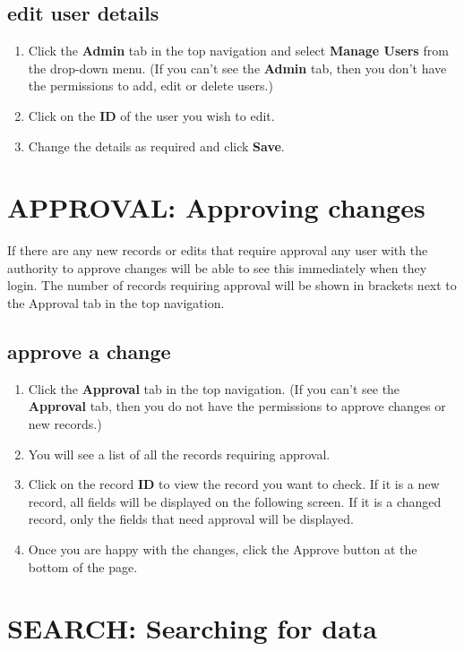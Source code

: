 \documentclass{ctrlo-int-toc}
\begin{document}
\begin{admin}
\subsection[edit user details]{edit user details}
\begin{enumerate}
\item Click the \textbf{Admin} tab in the top navigation and select \textbf{Manage Users} from the drop-down menu. (If you can't see the \textbf{Admin} tab, then you don't have the permissions to add, edit or delete users.)
\item Click on the \textbf{ID} of the user you wish to edit.
\item Change the details as required and click \textbf{Save}.
\end{enumerate}
\clearpage\section[APPROVAL: Approving changes]{APPROVAL: Approving changes}
If there are any new records or edits that require approval any user with the authority to approve changes will be able to see this immediately when they login. The number of records requiring approval will be shown in brackets next to the Approval tab in the top navigation. 

\subsection[approve a change]{approve a change}
\begin{enumerate}
\item Click the \textbf{Approval} tab in the top navigation. (If you can't see the \textbf{Approval} tab, then you do not have the permissions to approve changes or new records.)
\item You will see a list of all the records requiring approval. 
\item Click on the record \textbf{ID} to view the record you want to check. If it is a new record, all fields will be displayed on the following screen. If it is a changed record, only the fields that need approval will be displayed. 
\item Once you are happy with the changes, click the Approve button at the bottom of the page. 
\end{enumerate}

\end{admin}

\clearpage\section{SEARCH: Searching for data}
\end{document}
